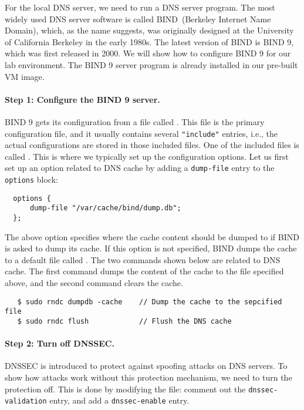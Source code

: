 For the local DNS server, we need to run a DNS server program.  The most
widely used DNS server software is called BIND~(Berkeley Internet Name
Domain), which, as the name suggests, was originally designed at the
University of California Berkeley in the early 1980s.  The latest version
of BIND is BIND 9, which was first released in 2000. We will show how to
configure BIND 9 for our lab environment.
The BIND 9 server program is already installed in our pre-built
\ubuntu VM image.


\paragraph{Step 1: Configure the BIND 9 server.}
BIND 9 gets its configuration from a file called . This file
is the primary configuration file, and it usually contains several \texttt{"include"}
entries, i.e., the actual configurations are stored in those included files. One of the
included files is called . This is where we typically set up
the configuration options. Let us first set up an option related to DNS cache by adding
a \texttt{dump-file} entry to the \texttt{options} block:

\begin{lstlisting}
  options {
      dump-file "/var/cache/bind/dump.db";
  };
\end{lstlisting}


The above option specifies where the cache content should be dumped to if BIND is asked to dump
its cache.  If this option is not specified, BIND dumps the cache to a default file
called .
The two commands shown below are related to DNS cache.
The first command dumps the content of the cache to the file specified above, and
the second command clears the cache.

\begin{lstlisting}
   $ sudo rndc dumpdb -cache    // Dump the cache to the sepcified file
   $ sudo rndc flush            // Flush the DNS cache
\end{lstlisting}


\paragraph{Step 2: Turn off DNSSEC.}
DNSSEC is introduced to protect against spoofing attacks on DNS servers.
To show how attacks work
without this protection mechanism, we need to turn the protection off.
This is done by modifying the  file:
comment out the {\tt dnssec-validation} entry, and
add a {\tt dnssec-enable} entry.

